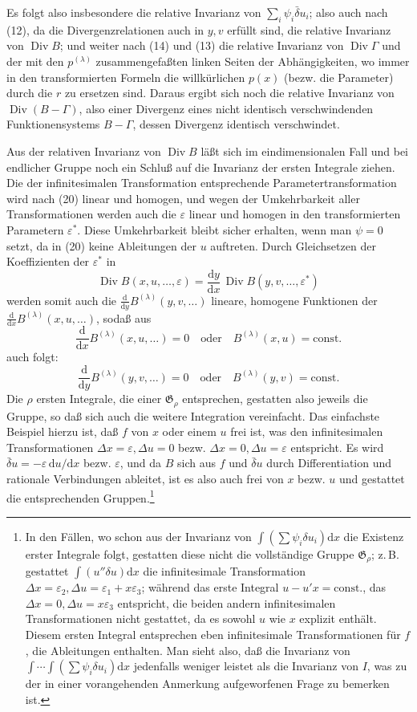 \documentclass[11pt]{article}
\newcommand{\D}{\Delta}
\providecommand{\eps}{\varepsilon}
\providecommand{\dd}{\mathrm d}
\providecommand{\Div}{\operatorname{Div}}
\providecommand{\G}{\mathfrak G}
\providecommand{\bd}{\bar{\delta}}
\providecommand{\dd}{\mathrm d}
\begin{document}
Es folgt also insbesondere die relative Invarianz von \(\sum_i\psi_i\bd u_i\); also auch nach (12), da die Divergenzrelationen auch in \(y,v\) erfüllt sind, die relative Invarianz von \(\Div B\); und weiter nach (14) und (13) die relative Invarianz von \(\Div\Gamma\) und der mit den \(p^{(\lambda)}\) zusammengefaßten linken Seiten der Abhängigkeiten, wo immer in den transformierten Formeln die willkürlichen \(p(x)\) (bezw. die Parameter) durch die \(r\) zu ersetzen sind. Daraus ergibt sich noch die relative Invarianz von \(\Div(B-\Gamma)\), also einer Divergenz eines nicht identisch verschwindenden Funktionensystems \(B-\Gamma\), dessen Divergenz identisch verschwindet.

Aus der relativen Invarianz von \(\Div B\) läßt sich im eindimensionalen Fall und bei endlicher Gruppe noch ein Schluß auf die Invarianz der ersten Integrale ziehen. Die der infinitesimalen Transformation entsprechende Parametertransformation wird nach (20) linear und homogen, und wegen der Umkehrbarkeit aller Transformationen werden auch die \(\eps\) linear und homogen in den transformierten Parametern \(\eps^*\). Diese Umkehrbarkeit bleibt sicher erhalten, wenn man \(\psi=0\) setzt, da in (20) keine Ableitungen der \(u\) auftreten. Durch Gleichsetzen der Koeffizienten der \(\eps^*\) in
\[
\Div B(x,u,\ldots,\eps)=\frac{\dd y}{\dd x}\,\Div B(y,v,\ldots,\eps^*)
\]
werden somit auch die \(\frac{\dd}{\dd y}B^{(\lambda)}(y,v,\ldots)\) lineare, homogene Funktionen der \(\frac{\dd}{\dd x}B^{(\lambda)}(x,u,\ldots)\), sodaß aus
\[
\frac{\dd}{\dd x}B^{(\lambda)}(x,u,\ldots)=0
\quad\text{oder}\quad B^{(\lambda)}(x,u)=\mathrm{const.}
\]
auch folgt:
\[
\frac{\dd}{\dd y}B^{(\lambda)}(y,v,\ldots)=0
\quad\text{oder}\quad B^{(\lambda)}(y,v)=\mathrm{const.}
\]
Die \(\rho\) ersten Integrale, die einer \(\G_\rho\) entsprechen, gestatten also jeweils die Gruppe, so daß sich auch die weitere Integration vereinfacht. Das einfachste Beispiel hierzu ist, daß \(f\) von \(x\) oder einem \(u\) frei ist, was den infinitesimalen Transformationen \(\D x=\eps,\D u=0\) bezw. \(\D x=0,\D u=\eps\) entspricht. Es wird \(\bd u=-\eps\,\dd u/\dd x\) bezw. \(\eps\), und da \(B\) sich aus \(f\) und \(\bd u\) durch Differentiation und rationale Verbindungen ableitet, ist es also auch frei von \(x\) bezw. \(u\) und gestattet die entsprechenden Gruppen.\footnote{In den Fällen, wo schon aus der Invarianz von \(\int(\sum\psi_i\delta u_i)\dd x\) die Existenz erster Integrale folgt, gestatten diese nicht die vollständige Gruppe \(\G_\rho\); z.\,B. gestattet \(\int(u''\delta u)\dd x\) die infinitesimale Transformation \(\D x=\eps_2,\D u=\eps_1+x\eps_3\); während das erste Integral \(u-u'x=\mathrm{const.}\), das \(\D x=0,\D u=x\eps_3\) entspricht, die beiden andern infinitesimalen Transformationen nicht gestattet, da es sowohl \(u\) wie \(x\) explizit enthält. Diesem ersten Integral entsprechen eben infinitesimale Transformationen für \(f\), die Ableitungen enthalten. Man sieht also, daß die Invarianz von \(\int\!\cdots\!\int(\sum\psi_i\delta u_i)\dd x\) jedenfalls weniger leistet als die Invarianz von \(I\), was zu der in einer vorangehenden Anmerkung aufgeworfenen Frage zu bemerken ist.}
\end{document}
